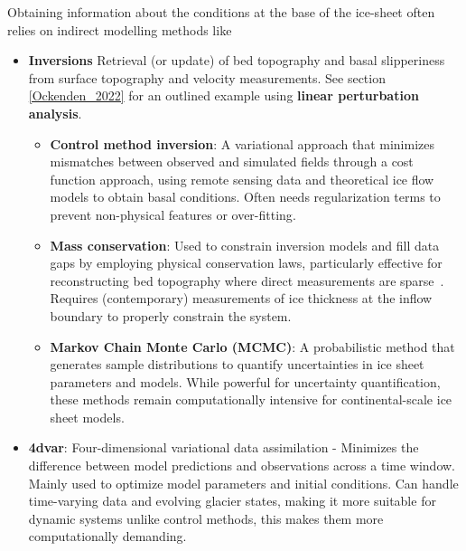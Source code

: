 Obtaining information about the conditions at the base of the ice-sheet often relies on indirect modelling methods like
\begin{itemize}

    \item\textbf{Inversions}
    Retrieval (or update) of bed topography and basal slipperiness from surface topography and velocity measurements\cite{deRydt_2013}. See section \ref{Ockenden_2022} for an outlined example using \textbf{linear perturbation analysis}.

        \begin{itemize}
            \item\textbf{Control method inversion}: A variational approach that minimizes mismatches between observed and simulated fields through a cost function approach, using remote sensing data and theoretical ice flow models to obtain basal conditions\cite{deRydt_2013}. Often needs regularization terms to prevent non-physical features or over-fitting\cite{Morlighem_Goldberg_2024}.

            \item\textbf{Mass conservation}: Used to constrain inversion models and fill data gaps by employing physical conservation laws, particularly effective for reconstructing bed topography where direct measurements are sparse~\cite{Morlighem_2017, Morlighem_2020}. Requires (contemporary) measurements of ice thickness at the inflow boundary to properly constrain the system\cite{Morlighem_Goldberg_2024}.

            \item\textbf{Markov Chain Monte Carlo (MCMC)}: A probabilistic method that generates sample distributions to quantify uncertainties in ice sheet parameters and models\cite{Morlighem_Goldberg_2024}. While powerful for uncertainty quantification, these methods remain computationally intensive for continental-scale ice sheet models\cite{Morlighem_Goldberg_2024}.

        \end{itemize}

    \item\textbf{4dvar}: Four-dimensional variational data assimilation - Minimizes the difference between model predictions and observations across a time window. Mainly used to optimize model parameters and initial conditions\cite{Morlighem_Goldberg_2024}. Can handle time-varying data and evolving glacier states, making it more suitable for dynamic systems unlike control methods, this makes them more computationally demanding\cite{Morlighem_Goldberg_2024}.


\end{itemize}
